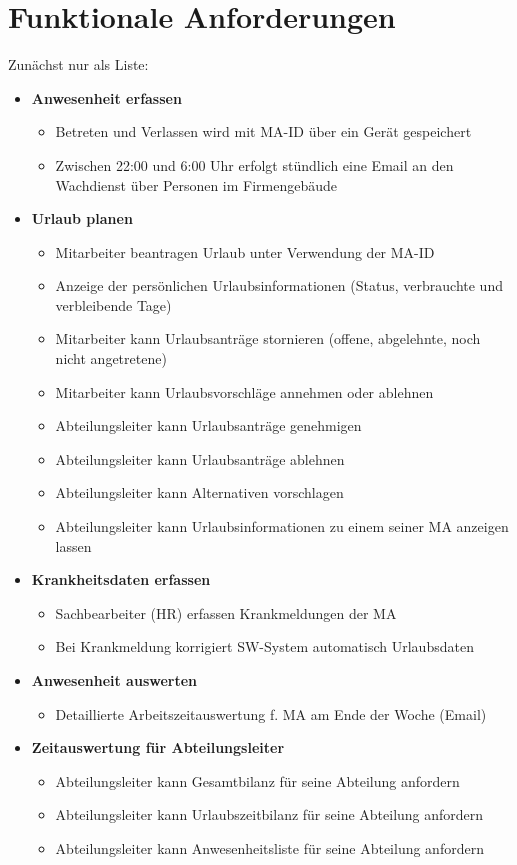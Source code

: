\section{Funktionale Anforderungen}
Zunächst nur als Liste:
\begin{itemize}
	\item \textbf{Anwesenheit erfassen}
	\begin{itemize}
		\item Betreten und Verlassen wird mit MA-ID \"uber ein Ger\"at gespeichert
		\item Zwischen 22:00 und 6:00 Uhr erfolgt st\"undlich eine Email an den Wachdienst \"uber Personen im Firmengeb\"aude
	\end{itemize}
	
	\item \textbf{Urlaub planen}
	\begin{itemize}
		\item Mitarbeiter beantragen Urlaub unter Verwendung der MA-ID
		\item Anzeige der pers\"onlichen Urlaubsinformationen (Status, verbrauchte und verbleibende Tage)
		\item Mitarbeiter kann Urlaubsantr\"age stornieren (offene, abgelehnte, noch nicht angetretene)
		\item Mitarbeiter kann Urlaubsvorschl\"age annehmen oder ablehnen
		\item Abteilungsleiter kann Urlaubsantr\"age genehmigen
		\item Abteilungsleiter kann Urlaubsantr\"age ablehnen
		\item Abteilungsleiter kann Alternativen vorschlagen
		\item Abteilungsleiter kann Urlaubsinformationen zu einem seiner MA anzeigen lassen
	\end{itemize}
	
	\item \textbf{Krankheitsdaten erfassen}
	\begin{itemize}
		\item	 Sachbearbeiter (HR) erfassen Krankmeldungen der MA
		\item Bei Krankmeldung korrigiert SW-System automatisch Urlaubsdaten
	\end{itemize}
	
	\item \textbf{Anwesenheit auswerten}
	\begin{itemize}
		\item Detaillierte Arbeitszeitauswertung f. MA am Ende der Woche (Email)
	\end{itemize}
	
	\item \textbf{Zeitauswertung f\"ur Abteilungsleiter}
	\begin{itemize}
		\item Abteilungsleiter kann Gesamtbilanz f\"ur seine Abteilung anfordern
		\item Abteilungsleiter kann Urlaubszeitbilanz f\"ur seine Abteilung anfordern
		\item Abteilungsleiter kann Anwesenheitsliste f\"ur seine Abteilung anfordern
	\end{itemize}
\end{itemize}


